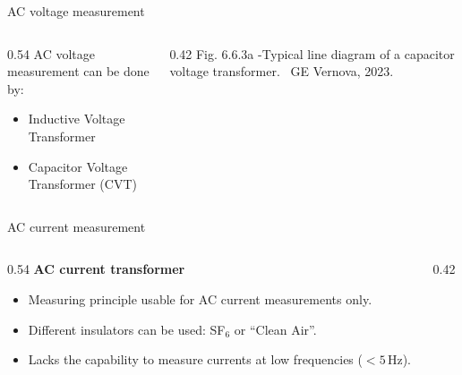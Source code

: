 \begin{frame}{AC voltage measurement}
  \begin{columns}[c,onlytextwidth]
    \begin{column}{0.54\textwidth}
      AC voltage measurement can be done by:
      \begin{itemize}
        \setlength{\itemsep}{0.4em}
        \item Inductive Voltage Transformer
        \item Capacitor Voltage Transformer (CVT)
      \end{itemize}
      \vspace{0.4em}

    \end{column}
    \begin{column}{0.42\textwidth}
      \centering
      {\color{atGray}\footnotesize Fig. 6.6.3a -Typical line diagram of a capacitor voltage transformer. \textcopyright\ GE Vernova, 2023.}      
    \end{column}
  \end{columns}
\end{frame}

\begin{frame}{AC current measurement}
  \begin{columns}[c,onlytextwidth]
    \begin{column}{0.54\textwidth}
      \textbf{AC current transformer}
      \begin{itemize}
        \setlength{\itemsep}{0.4em}
        \item Measuring principle usable for AC current measurements only.
        \item Different insulators can be used: SF$_6$ or ``Clean Air''.
        \item Lacks the capability to measure currents at low frequencies
              ($<5$\,Hz).
      \end{itemize}
    \end{column}
    \begin{column}{0.42\textwidth}
      \centering
    \end{column}
  \end{columns}
\end{frame}

